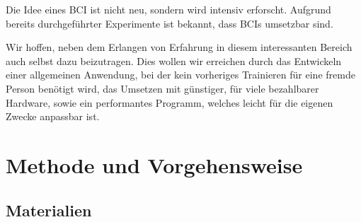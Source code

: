 \documentclass{scrartcl}
\begin{document}
	Die Idee eines BCI ist nicht neu, sondern wird intensiv erforscht. Aufgrund bereits durchgeführter Experimente ist bekannt, dass BCIs umsetzbar sind. \cite{BCIChaudhary}
	
	Wir hoffen, neben dem Erlangen von Erfahrung in diesem interessanten Bereich auch selbst dazu beizutragen. Dies wollen wir erreichen durch das Entwickeln einer allgemeinen Anwendung, bei der kein vorheriges Trainieren für eine fremde Person benötigt wird, das Umsetzen mit günstiger, für viele bezahlbarer Hardware, sowie ein performantes Programm, welches leicht für die eigenen Zwecke anpassbar ist.

	\newpage

	\section{Methode und Vorgehensweise}

	\subsection{Materialien} \label{Materialien}
\end{document}
